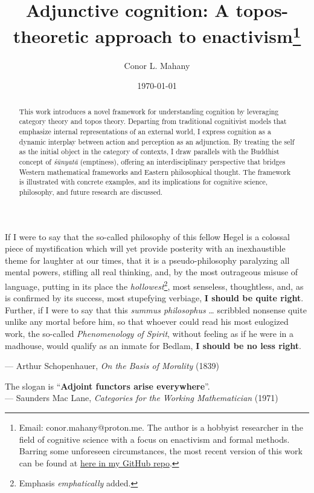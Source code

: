 \documentclass{article}
\title{Adjunctive cognition: A topos-theoretic approach to enactivism\footnote{
    Email: conor.mahany@proton.me. The author is a hobbyist researcher in the field of cognitive science with a focus on enactivism and formal methods. Barring some unforeseen circumstances, the most recent version of this work can be found at \href{https://github.com/laundrevity/enaction/blob/master/enaction.pdf}{here in my GitHub repo}.
}}
\author{Conor L. Mahany}
\date{\today}
\begin{document}
\maketitle

\begin{abstract}
    This work introduces a novel framework for understanding cognition by leveraging category theory and topos theory. Departing from traditional cognitivist models that emphasize internal representations of an external world, I express cognition as a dynamic interplay between action and perception as an adjunction. By treating the self as the initial object in the category of contexts, I draw parallels with the Buddhist concept of \emph{śūnyatā} (emptiness), offering an interdisciplinary perspective that bridges Western mathematical frameworks and Eastern philosophical thought. The framework is illustrated with concrete examples, and its implications for cognitive science, philosophy, and future research are discussed.
\end{abstract}

\newpage
\begin{center}
    If I were to say that the so-called philosophy of this fellow Hegel is a colossal piece of mystification which will yet provide posterity with an inexhaustible theme for laughter at our times, that it is a pseudo-philosophy paralyzing all mental powers, stifling all real thinking, and, by the most outrageous misuse of language, putting in its place the \emph{hollowest}\footnote{Emphasis \emph{emphatically} added.}, most senseless, thoughtless, and, as is confirmed by its success, most stupefying verbiage, \textbf{I should be quite right}.\\
    \vspace{0.25cm}
    Further, if I were to say that this \emph{summus philosophus} … scribbled nonsense quite unlike any mortal before him, so that whoever could read his most eulogized work, the so-called \emph{Phenomenology of Spirit}, without feeling as if he were in a madhouse, would qualify as an inmate for Bedlam, \textbf{I should be no less right}.

    \vspace{0.25cm}
    — Arthur Schopenhauer, \emph{On the Basis of Morality} (1839)
\end{center}

\vspace{20px} %

\begin{center}
    The slogan is ``\textbf{Adjoint functors arise everywhere}''. \\

    \vspace{0.25cm}
    — Saunders Mac Lane, \emph{Categories for the Working Mathematician} (1971)
\end{center}
\end{document}
